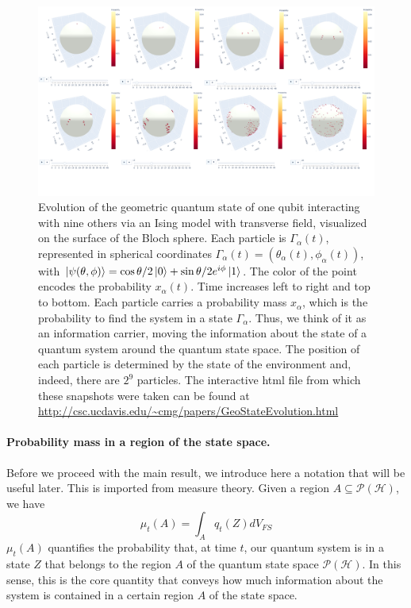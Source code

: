 \documentclass[draft,nofootinbib,pre,twocolumn,showpacs,showkeys,preprintnumbers,floatfix]{revtex4-1}
\newcommand{\1}{\mathbbm{1}}
\newcommand{\PH}{\mathcal{P}(\mathcal{H})}
\begin{document}
\begin{figure}[t!]
\centering
\includegraphics[width=.9\textwidth]{./img/DynamicsLong.pdf}
\caption{Evolution of the geometric quantum state of one qubit interacting with 
	nine others via an Ising model with transverse field, visualized on the surface of the Bloch
	sphere. Each particle is $\Gamma_\alpha(t)$, represented in spherical coordinates 
	$\Gamma_\alpha(t) = \left( \theta_\alpha(t),\phi_\alpha(t)\right)$, with $\ket{\psi(\theta,\phi)} = 
	\cos \theta/2 \ket{0}+ \sin \theta/2 e^{i\phi}\ket{1}$. The color of the point encodes the 
	probability $x_\alpha(t)$. Time increases left to right and top to bottom. Each particle
	carries a probability mass $x_\alpha$, which is the probability to find the system in a 
	state $\Gamma_\alpha$. Thus, we think of it as an information carrier, moving the 
	information about the state of a quantum system around the quantum state space.
	The position of each particle is determined by the state of the environment and, indeed, 
	there are $2^9$ particles. The interactive html file from which these snapshots were
	taken can be found at \url{http://csc.ucdavis.edu/~cmg/papers/GeoStateEvolution.html}
	}
\label{fig:gqs_dynamics}
\end{figure}
\paragraph*{Probability mass in a region of the state space.} Before we proceed with the
main result, we introduce here a notation that will be useful later. This is imported
from measure theory. Given a region $A \subseteq \PH$, we have
\begin{equation}
\mu_t(A) = \int_A q_t(Z) dV_{FS}
\end{equation}
$\mu_t(A)$ quantifies the probability that, at time $t$, our quantum system is in a state $Z$ that 
belongs to the region $A$ of the quantum state space $\PH$. In this sense, this is the core quantity
that conveys how much information about the system is contained in a certain region $A$
of the state space.
\end{document}
